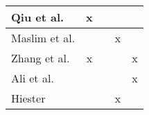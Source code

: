 \begin{table}[!ht]
\begin{tabular}{l|c|c|c|c}
Qiu et al. \cite{qiu_new_2014}                  & x      &        &      &       \\ \hline
Maslim et al. \cite{maslim_distributed_2014}       &        &        & x    &       \\ \hline
Zhang et al. \cite{zhang_svm_2016}                & x      &        &      & x      \\ \hline
Ali et al. \cite{ali_classification_2018}       &        &        &      & x     \\ \hline
Hiester \cite{hiester_file_2018}             &        &        & x    &       \\ %
\end{tabular}
\end{table}